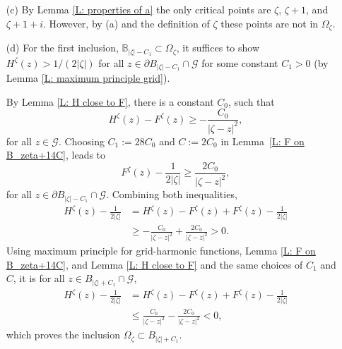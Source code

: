 \documentclass[11pt]{article}
\makeatletter
\renewenvironment{proof}[1][\proofname]{
   \par\pushQED{\qed}\normalfont
   \topsep6\p@\@plus6\p@\relax
   \trivlist\item[\hskip\labelsep\bfseries#1\@addpunct{.}]
   \ignorespaces
}{
   \popQED\endtrivlist\@endpefalse
}
\numberwithin{equation}{section}
\def\OZ{\Omega_{\zeta}}
\makeatother
\begin{document}
\begin{proof}[Proof of Lemma \ref{Properties of H}]
\begin{itemize}
    \item[(c)]  
      By Lemma \ref{L: properties of a} the 
      only critical points are 
      $\zeta$, $\zeta + 1$, and $\zeta+1+i$.  
      However, by (a) and the definition of $\zeta$ these points are not in $\OZ$. 

    \item[(d)]
      For the first inclusion, $\mathbb{B}_{|\zeta| - C_1} \subset \OZ$, it suffices 
      to show $H^{\zeta}(z) > 1/(2|\zeta|)$ for all 
      \hbox{$z \in \partial B_{|\zeta|-C_1} \cap \mathcal{G}$} for some 
      constant $C_1 > 0$ (by Lemma \ref{L: maximum principle grid}).

      By Lemma \ref{L: H close to F}, there is a constant $C_0$, such that 
      \begin{equation}
        \nonumber
        H^{\zeta}(z) - F^{\zeta}(z) \geq - \frac{C_0}{|\zeta - z|^2},
      \end{equation}
      for all $z \in \mathcal{G}$. 
      Choosing $C_1 := 28C_0$ and $C := 2C_0$ in \hbox{Lemma \ref{L: F on B_zeta+14C}}, %
      leads to 
      \begin{equation}\nonumber
        F^{\zeta}(z) - \frac{1}{2|\zeta|} \geq \frac{2C_0}{|\zeta-z|^2},
      \end{equation}
      for all $z \in \partial B_{|\zeta|-C_1} \cap \mathcal{G}$. 
      Combining both inequalities,
      \begin{equation}\nonumber
      \begin{split}
        H^{\zeta}(z) - \frac{1}{2|\zeta|} 
        &=  H^{\zeta}(z)-F^{\zeta}(z)+F^{\zeta}(z) - \frac{1}{2|\zeta|}\\
        &\geq -\frac{C_0}{|\zeta - z|^2}  
              +\frac{2 C_0}{|\zeta - z|^2} > 0.
      \end{split}
      \end{equation}
      Using maximum principle for grid-harmonic functions, Lemma \ref{L: F on B_zeta+14C}, 
      and Lemma \ref{L: H close to F} and the same choices of $C_1$ and $C$, it is for 
      all $z \in B_{|\zeta|+C_1} \cap \mathcal{G}$,
      \begin{equation*}
        \begin{split}
          H^{\zeta}(z) - \frac{1}{2|\zeta|} 
          & =  H^{\zeta}(z) - F^{\zeta}(z) + F^{\zeta}(z) - \frac{1}{2|\zeta|} \\
          & \leq \frac{C_0}{|\zeta - z|^2} - \frac{2C_0}{|\zeta-z|^2} 
          < 0, 
        \end{split}
      \end{equation*}
      which proves the inclusion $\OZ \subset B_{|\zeta|+C_1}$.


\end{itemize}
\end{proof}
\end{document}
